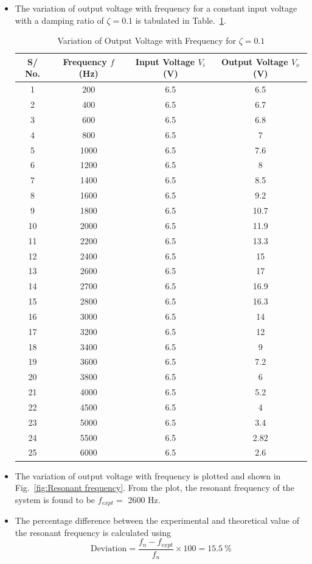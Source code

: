 \documentclass[11pt]{scrreprt}
\begin{document}
\begin{itemize}
\item The variation of output voltage with frequency for a constant input voltage with a damping ratio of $\zeta = 0.1$ is tabulated in Table.~\ref{tab:OP_vs_freq}. 
\begin{table}[H]
\centering
\caption{Variation of Output Voltage with Frequency for $\zeta = 0.1$}
\begin{tabular}{|c|c|c|c|}
\hline
\textbf{S/ No.} & \textbf{Frequency $f$ (Hz)} & \textbf{Input Voltage $V_i$ (V)} & \textbf{Output Voltage $V_o$ (V)} \\ \hline
1 & 200 & 6.5 & 6.5 \\ \hline
2 & 400 & 6.5 & 6.7 \\ \hline
3 & 600 & 6.5 & 6.8 \\ \hline
4 & 800 & 6.5 & 7 \\ \hline
5 & 1000 & 6.5 & 7.6 \\ \hline
6 & 1200 & 6.5 & 8 \\ \hline
7 & 1400 & 6.5 & 8.5 \\ \hline
8 & 1600 & 6.5 & 9.2 \\ \hline
9 & 1800 & 6.5 & 10.7 \\ \hline
10 & 2000 & 6.5 & 11.9 \\ \hline
11 & 2200 & 6.5 & 13.3 \\ \hline
12 & 2400 & 6.5 & 15 \\ \hline
13 & 2600 & 6.5 & 17 \\ \hline
14 & 2700 & 6.5 & 16.9 \\ \hline
15 & 2800 & 6.5 & 16.3 \\ \hline
16 & 3000 & 6.5 & 14 \\ \hline
17 & 3200 & 6.5 & 12 \\ \hline
18 & 3400 & 6.5 & 9 \\ \hline
19 & 3600 & 6.5 & 7.2 \\ \hline
20 & 3800 & 6.5 & 6 \\ \hline
21 & 4000 & 6.5 & 5.2 \\ \hline
22 & 4500 & 6.5 & 4 \\ \hline
23 & 5000 & 6.5 & 3.4 \\ \hline
24 & 5500 & 6.5 & 2.82 \\ \hline
25 & 6000 & 6.5 & 2.6 \\ \hline
\end{tabular}
\label{tab:OP_vs_freq}
\end{table}

\item The variation of output voltage with frequency is plotted and shown in Fig.~\ref{fig:Resonant frequency}. From the plot, the resonant frequency of the system is found to be $f_{expt} = $ 2600 Hz.

\item The percentage difference between the experimental and theoretical value of the resonant frequency is calculated using
\begin{equation}
\text{Deviation} = \frac{f_{n} - f_{expt}}{f_{n}}\times 100 = 15.5~\%
\end{equation}
\end{itemize}
\end{document}
